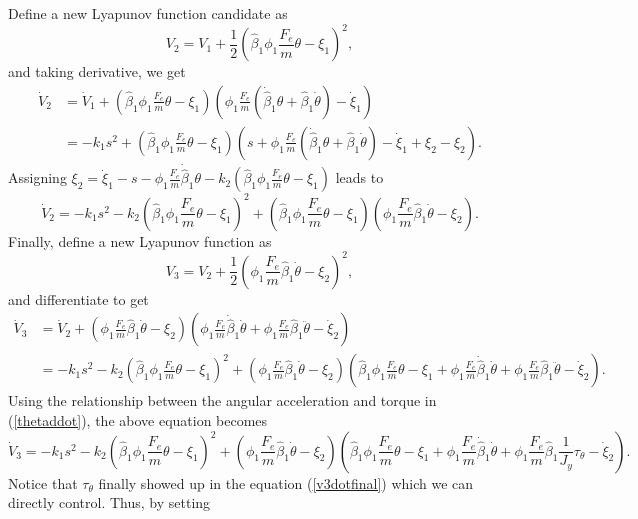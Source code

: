 Define a new Lyapunov function candidate as
\begin{equation}
V_2=V_1+\frac{1}{2}(\hat{\beta}_1\phi_1\frac{F_e}{m}\theta-\xi_1)^2,
\label{v2}
\end{equation}
and taking derivative, we get
\begin{align}
\dot{V}_2&=\dot{V}_1+(\hat{\beta}_1\phi_1\frac{F_e}{m}\theta-\xi_1)(\phi_1\frac{F_e}{m}(\dot{\hat{\beta}}_1\theta+\hat{\beta}_1\dot{\theta})-\dot{\xi}_1)
\\&=-k_1s^2+
(\hat{\beta}_1\phi_1\frac{F_e}{m}\theta-\xi_1)
(s+\phi_1\frac{F_e}{m}(\dot{\hat{\beta}}_1\theta+\hat{\beta}_1\dot{\theta})-\dot{\xi}_1+\xi_2-\xi_2).
\end{align}
Assigning $\xi_2=\dot{\xi}_1-s-\phi_1\frac{F_e}{m}\dot{\hat{\beta}}_1\theta-k_2(\hat{\beta}_1\phi_1\frac{F_e}{m}\theta-\xi_1)$ leads to
\begin{equation}
\dot{V}_2=-k_1s^2-k_2(\hat{\beta}_1\phi_1\frac{F_e}{m}\theta-\xi_1)^2+
(\hat{\beta}_1\phi_1\frac{F_e}{m}\theta-\xi_1)
(\phi_1\frac{F_e}{m}\hat{\beta}_1\dot{\theta}-\xi_2).
\label{v2dotfinal}
\end{equation}
Finally, define a new Lyapunov function as 
\begin{equation}
V_3=V_2+\frac{1}{2}(\phi_1\frac{F_e}{m}\hat{\beta}_1\dot{\theta}-\xi_2)^2,
\label{v3}
\end{equation}
and differentiate to get
\begin{align}
\dot{V}_3&=\dot{V}_2+
(\phi_1\frac{F_e}{m}\hat{\beta}_1\dot{\theta}-\xi_2)
(\phi_1\frac{F_e}{m}\dot{\hat{\beta}}_1\dot{\theta}+\phi_1\frac{F_e}{m}\hat{\beta}_1\ddot{\theta}-\dot{\xi}_2)
\\&=-k_1s^2-k_2(\hat{\beta}_1\phi_1\frac{F_e}{m}\theta-\xi_1)^2+(\phi_1\frac{F_e}{m}\hat{\beta}_1\dot{\theta}-\xi_2)
(\hat{\beta}_1\phi_1\frac{F_e}{m}\theta-\xi_1+\phi_1\frac{F_e}{m}\dot{\hat{\beta}}_1\dot{\theta}+\phi_1\frac{F_e}{m}\hat{\beta}_1\ddot{\theta}-\dot{\xi}_2).
\label{v3dot}
\end{align}
 Using the relationship between the angular acceleration and torque in (\ref{thetaddot}), the above equation becomes
\begin{equation}
\dot{V}_3=-k_1s^2-k_2(\hat{\beta}_1\phi_1\frac{F_e}{m}\theta-\xi_1)^2+(\phi_1\frac{F_e}{m}\hat{\beta}_1\dot{\theta}-\xi_2)
(\hat{\beta}_1\phi_1\frac{F_e}{m}\theta-\xi_1+\phi_1\frac{F_e}{m}\dot{\hat{\beta}}_1\dot{\theta}+\phi_1\frac{F_e}{m}\hat{\beta}_1\frac{1}{J_y}\tau_\theta-\dot{\xi}_2).
\label{v3dotfinal}
\end{equation}
Notice that $\tau_\theta$ finally showed up in the equation (\ref{v3dotfinal}) which we can directly control. Thus, by setting 
